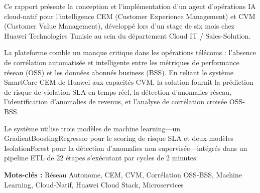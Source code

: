 Ce rapport pr\'esente la conception et l'impl\'ementation d'un agent d'op\'erations IA cloud-natif pour l'intelligence CEM (Customer Experience Management) et CVM (Customer Value Management), d\'evelopp\'e lors d'un stage de six mois chez Huawei Technologies Tunisie au sein du d\'epartement Cloud IT / Sales-Solution.

La plateforme comble un manque critique dans les op\'erations t\'el\'ecoms : l'absence de corr\'elation automatis\'ee et intelligente entre les m\'etriques de performance r\'eseau (OSS) et les donn\'ees abonn\'es business (BSS). En reliant le syst\`eme SmartCare CEM de Huawei aux capacit\'es CVM, la solution fournit la pr\'ediction de risque de violation SLA en temps r\'eel, la d\'etection d'anomalies r\'eseau, l'identification d'anomalies de revenus, et l'analyse de corr\'elation crois\'ee OSS-BSS.

Le syst\`eme utilise trois mod\`eles de machine learning---un GradientBoostingRegressor pour le scoring de risque SLA et deux mod\`eles IsolationForest pour la d\'etection d'anomalies non supervis\'ee---int\'egr\'es dans un pipeline ETL de 22 \'etapes s'ex\'ecutant par cycles de 2 minutes.

\textbf{Mots-cl\'es :} R\'eseau Autonome, CEM, CVM, Corr\'elation OSS-BSS, Machine Learning, Cloud-Natif, Huawei Cloud Stack, Microservices

\newpage
